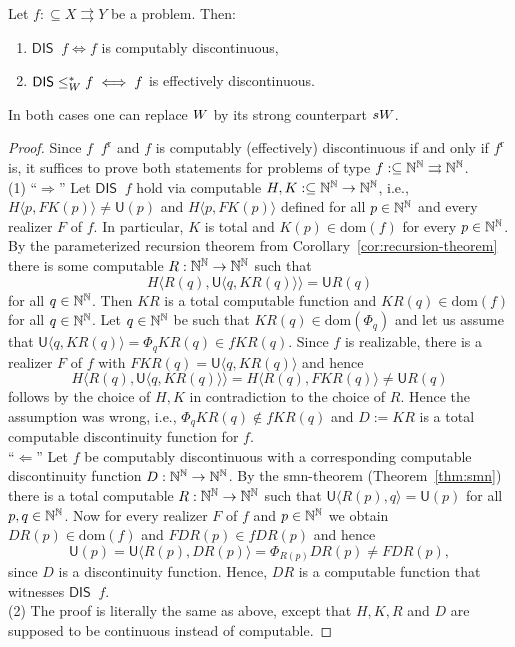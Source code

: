 \documentclass{amsart}
\def\IN{{\Bbb{N}}}
\def\TO{\Longrightarrow}
\def\In{\subseteq}
\def\mto{\rightrightarrows}
\def\U{{\mathsf{{U}}}}
\def\leqW{\mathop{\leq_{\mathrm{W}}}}
\def\leqSW{\mathop{\leq_{\mathrm{sW}}}}
\def\equivSW{\mathop{\equiv_{\mathrm{sW}}}}
\def\leqW{\mathop{\leq_{\mathrm{W}}}}
\def\leqSW{\mathop{\leq_{\mathrm{sW}}}}
\def\equivSW{\mathop{\equiv_{\mathrm{sW}}}}
\def\dom{{\mathrm{dom}}}
\def\DIS{\mathsf{DIS}}
\begin{document}
\begin{theorem}
\label{thm:effective-discontinuity}
Let $f:\In X\mto Y$ be a problem. Then:
\begin{enumerate}
\item $\DIS\leqW f\iff f$ is computably discontinuous,
\item $\DIS\leq_{\rm W}^* f\iff f$ is effectively discontinuous.
\end{enumerate}
In both cases one can replace ${\rm W}$ by its strong counterpart ${\rm sW}$.
\end{theorem}
\begin{proof}
Since $f\equivSW f^{\mathrm r}$ and $f$ is computably (effectively) discontinuous if and only if $f^\mathrm{r}$ is, 
it suffices to prove both statements for problems of type $f:\In\IN^\IN\mto\IN^\IN$.\medskip\\
(1) 
``$\TO$'' Let $\DIS\leqW f$ hold via computable $H,K:\In\IN^\IN\to\IN^\IN$, i.e.,
$H\langle p,FK(p)\rangle\not=\U(p)$ and $H\langle p,FK(p)\rangle$ defined for all $p\in\IN^\IN$ and every realizer $F$  of $f$.
In particular, $K$ is total and $K(p)\in\dom(f)$ for every $p\in\IN^\IN$.
By the parameterized recursion theorem from Corollary~\ref{cor:recursion-theorem} there is some computable $R:\IN^\IN\to\IN^\IN$ such that
\[H\langle R(q),\U\langle q,KR(q)\rangle\rangle=\U R(q)\] 
for all $q\in\IN^\IN$. Then $KR$ is a total computable function and $KR(q)\in\dom(f)$ for all $q\in\IN^\IN$.
Let $q\in\IN^\IN$ be such that $KR(q)\in\dom(\Phi_q)$ and let us assume that $\U\langle q,KR(q)\rangle=\Phi_qKR(q)\in fKR(q)$.
Since $f$ is realizable, there is a realizer $F$ of $f$ with $FKR(q)=\U\langle q,KR(q)\rangle$ and hence 
\[H\langle R(q),\U\langle q,KR(q)\rangle\rangle=H\langle R(q),FKR(q)\rangle\not=\U R(q)\] 
follows
by the choice of $H,K$ in contradiction to the choice of $R$.
Hence the assumption was wrong, i.e., $\Phi_qKR(q)\not\in fKR(q)$ and $D:=KR$ is a total computable discontinuity function for $f$.\\
``$\Longleftarrow$''
Let $f$ be computably discontinuous with a corresponding computable discontinuity function 
$D:\IN^\IN\to\IN^\IN$.
By the smn-theorem (Theorem~\ref{thm:smn}) there is a total computable $R:\IN^\IN\to\IN^\IN$ such that
$\U\langle R(p),q\rangle=\U(p)$ for all $p,q\in\IN^\IN$. 
Now for every realizer $F$ of $f$ and $p\in\IN^\IN$ we obtain $DR(p)\in\dom(f)$ and $FDR(p)\in fDR(p)$ and hence
\[\U(p)=\U\langle R(p),DR(p)\rangle=\Phi_{R(p)}DR(p)\not=FDR(p),\]
since $D$ is a discontinuity function.
Hence, $DR$ is a computable function that witnesses $\DIS\leqSW f$.\medskip\\
(2) The proof is literally the same as above, except that $H,K,R$ and $D$ are supposed to be continuous instead of computable.
\end{proof}
\end{document}
